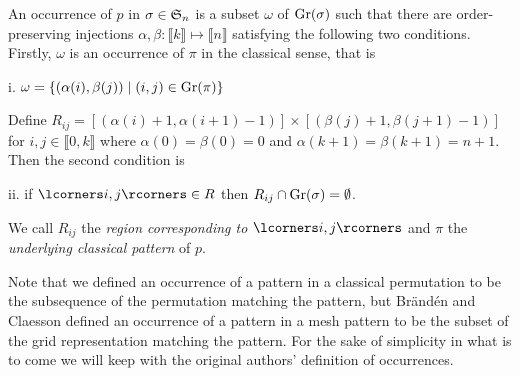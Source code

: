 \begin{definition}
  An occurrence of $p$ in $\sigma \in \S_n$ is a subset $\omega$ of 
  $\Gr{\sigma}$ such that there are order-preserving injections $\alpha, \beta 
  \colon \llbracket k \rrbracket \mapsto \llbracket n \rrbracket$ satisfying the 
  following two conditions. Firstly, $\omega$ is an occurrence of $\pi$ in the 
  classical sense, that is

    i. $\omega = \left\{ \left( \alpha(i), \beta(j) \right) \mid (i, j) \in \Gr{\pi} \right\}$

  \noindent
  Define $R_{ij} = \left[ \left( \alpha(i) + 1, \alpha(i + 1) - 1 \right) 
  \right] \times \left[ \left( \beta(j) + 1, \beta(j + 1) - 1 \right) \right]$ 
  for $i,j \in \llbracket 0, k \rrbracket$ where $\alpha(0) = \beta(0) = 0$ and 
  $\alpha(k + 1) = \beta(k + 1) = n + 1$. Then the second condition is

    ii. if $\boks{i, j} \in R$ then $R_{ij} \cap \Gr{\sigma} = \emptyset$.

  \noindent
  We call $R_{ij}$ the \emph{region corresponding to} $\boks{i,j}$ and $\pi$ 
  the \emph{underlying classical pattern} of $p$.
\end{definition}

Note that we defined an occurrence of a pattern in a classical permutation to be 
the subsequence of the permutation matching the pattern, but Brändén and 
Claesson defined an occurrence of a pattern in a mesh pattern to be the subset 
of the grid representation matching the pattern. For the sake of simplicity in 
what is to come we will keep with the original authors' definition of 
occurrences.

